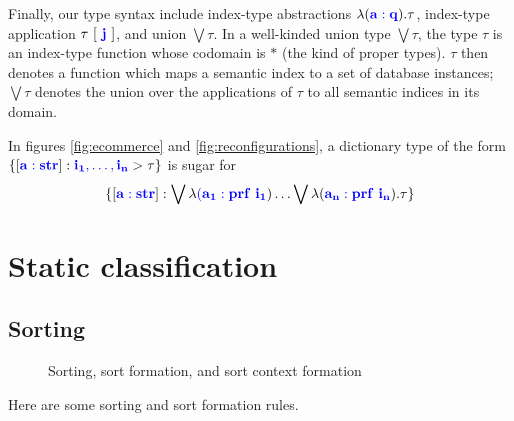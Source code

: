 \documentclass[sigplan,10pt,review,anonymous]{acmart}
\newcommand{\blum}[1]{\mathbf{\color{blue}{#1}}}
\begin{document}
Finally, our type syntax include index-type abstractions $\lambda (\blum{a : q}). \tau$, index-type application $\tau~[~\blum{j}~]$, and union $\bigvee \tau$. In a well-kinded union type $\bigvee \tau$, the type $\tau$ is an index-type function whose codomain is $\ast$ (the kind of proper types). $\tau$ then denotes a function which maps a semantic index to a set of database instances; $\bigvee \tau$ denotes the union over the applications of $\tau$ to all semantic indices in its domain. 
   
In figures \ref{fig:ecommerce} and \ref{fig:reconfigurations}, a dictionary type of the form $\{ [\blum{a :str}] : \blum{i_1, \ldots, i_n} > \tau \}$ is sugar for $$\{ [\blum{a :str}] : \bigvee \lambda \blum{(a_1 : prf~i_1}) \ldots \bigvee \lambda (\blum{a_n : prf~i_n}). \tau \}$$

\section{Static classification}

\subsection{Sorting}

\begin{figure}
\caption{Sorting, sort formation, and sort context formation}
\label{fig:sorting}
\end{figure}

Here are some sorting and sort formation rules.
\end{document}

